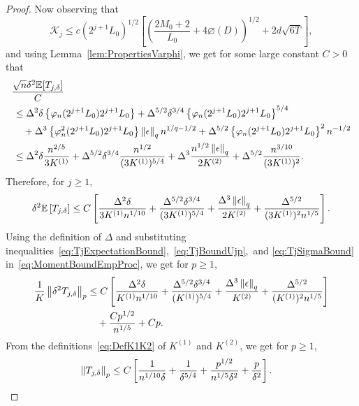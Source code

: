 \begin{proof}
Now observing that
\[
\mathcal{K}_j \le c\left(2^{j+1}L_0\right)^{1/2}\left[\left(\frac{2M_0 + 2}{L_0} + 4\diameter(D)\right)^{1/2} + 2d\sqrt{6T}\right],
\]
and using Lemma~\ref{lem:PropertiesVarphi}, we get for some large constant $C>0$ that
\begin{align*}
&\frac{\sqrt{n}\delta^2\mathbb{E}[T_{j,\delta}]}{C}\\
&\,\le \Delta^2\delta\left\{\varphi_n(2^{j+1}L_0)2^{j+1}L_0\right\} + \Delta^{5/2}\delta^{3/4}\left\{\varphi_n(2^{j+1}L_0)2^{j+1}L_0\right\}^{5/4}\\ &\,\quad+ \Delta^{3}\left\{\varphi_n^2(2^{j+1}L_0)2^{j+1}L_0\right\}\left\lVert\epsilon\right\rVert_qn^{1/q - 1/2} + \Delta^{5/2}\left\{\varphi_n(2^{j+1}L_0)2^{j+1}L_0\right\}^{2}n^{-1/2}\\
&\,\le \Delta^2\delta\frac{n^{2/5}}{3K^{(1)}} + \Delta^{5/2}\delta^{3/4}\frac{n^{1/2}}{(3K^{(1)})^{5/4}} + \Delta^3\frac{n^{1/2}\left\lVert\epsilon\right\rVert_q}{2K^{(2)}} + \Delta^{5/2}\frac{n^{3/10}}{(3K^{(1)})^2}.
\end{align*}
Therefore, for $j \ge 1$,
\begin{equation}\label{eq:TjExpectationBound}
{\delta^2\mathbb{E}\left[T_{j,\delta}\right]} \le C\left[\frac{\Delta^2\delta}{3K^{(1)}n^{1/10}} + \frac{\Delta^{5/2}\delta^{3/4}}{(3K^{(1)})^{5/4}} + \frac{\Delta^3\left\lVert\epsilon\right\rVert_q}{2K^{(2)}} + \frac{\Delta^{5/2}}{(3K^{(1)})^2n^{1/5}}\right].
\end{equation}
Using the definition of $\Delta$ and substituting inequalities~\eqref{eq:TjExpectationBound},~\eqref{eq:TjBoundUjp},~and \eqref{eq:TjSigmaBound} in~\eqref{eq:MomentBoundEmpProc}, we get for $p\ge 1$,
\begin{align*}
\frac{1}{K}\left\lVert\delta^2T_{j,\delta}\right\rVert_p &\le C\left[\frac{\Delta^2\delta}{K^{(1)}n^{1/10}} + \frac{\Delta^{5/2}\delta^{3/4}}{(K^{(1)})^{5/4}} + \frac{\Delta^3\left\lVert\epsilon\right\rVert_q}{K^{(2)}} + \frac{\Delta^{5/2}}{(K^{(1)})^2n^{1/5}}\right]\\
&\quad+ \frac{Cp^{1/2}}{n^{1/5}} + Cp.
\end{align*}
From the definitions~\eqref{eq:DefK1K2} of $K^{(1)}$ and $K^{(2)}$, we get for $p\ge 1$,
\begin{align*}
\norm{T_{j,\delta}}_p &\le C\left[\frac{1}{n^{1/10}\delta} + \frac{1}{\delta^{5/4}} + \frac{p^{1/2}}{n^{1/5}\delta^2} + \frac{p}{\delta^2}\right].%

\end{align*}
\end{proof}
